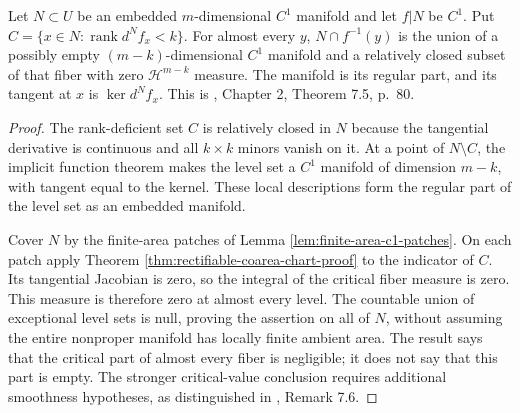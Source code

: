 \begin{theorem}\label{thm:c1-sard-fiberwise}
Let $N\subset U$ be an embedded $m$-dimensional $C^1$ manifold and let $f|N$ be $C^1$. Put $C=\{x\in N:\operatorname{rank}d^Nf_x<k\}$. For almost every $y$, $N\cap f^{-1}(y)$ is the union of a possibly empty $(m-k)$-dimensional $C^1$ manifold and a relatively closed subset of that fiber with zero $\mathcal H^{m-k}$ measure. The manifold is its regular part, and its tangent at $x$ is $\ker d^Nf_x$. This is \cite{Sim18}, Chapter 2, Theorem 7.5, p.~80.
\end{theorem}
\begin{proof}
The rank-deficient set $C$ is relatively closed in $N$ because the tangential derivative is continuous and all $k\times k$ minors vanish on it. At a point of $N\setminus C$, the implicit function theorem makes the level set a $C^1$ manifold of dimension $m-k$, with tangent equal to the kernel. These local descriptions form the regular part of the level set as an embedded manifold.

Cover $N$ by the finite-area patches of Lemma \ref{lem:finite-area-c1-patches}. On each patch apply Theorem \ref{thm:rectifiable-coarea-chart-proof} to the indicator of $C$. Its tangential Jacobian is zero, so the integral of the critical fiber measure is zero. This measure is therefore zero at almost every level. The countable union of exceptional level sets is null, proving the assertion on all of $N$, without assuming the entire nonproper manifold has locally finite ambient area. The result says that the critical part of almost every fiber is negligible; it does not say that this part is empty. The stronger critical-value conclusion requires additional smoothness hypotheses, as distinguished in \cite{Sim18}, Remark 7.6.
\end{proof}

